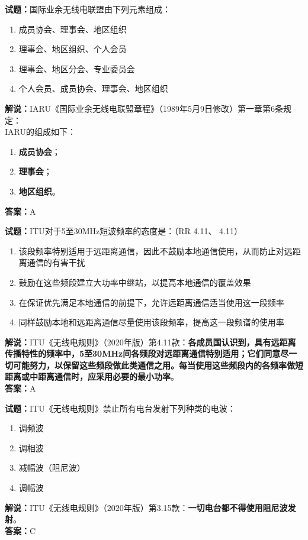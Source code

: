 \documentclass{ctexbook}
\begin{document}
\bigskip

\noindent\textbf{试题：}国际业余无线电联盟由下列元素组成：
\begin{enumerate}[leftmargin=3em]
  \item 成员协会、理事会、地区组织
  \item 理事会、地区组织、个人会员
  \item 理事会、地区分会、专业委员会
  \item 个人会员、成员协会、理事会、地区组织
\end{enumerate}
\noindent\textbf{解说：}IARU《国际业余无线电联盟章程》（1989年5月9日修改）第一章第6条规定：\\
IARU的组成如下：
\begin{enumerate}[leftmargin=3em, label=\alph*)]
  \item \textbf{成员协会}；
  \item \textbf{理事会}；
  \item \textbf{地区组织}。
\end{enumerate}
\noindent\textbf{答案：}A

\bigskip

\noindent\textbf{试题：}ITU对于5至30\unit{\MHz}短波频率的态度是：（RR 4.11、 4.11）
\begin{enumerate}[leftmargin=3em]
  \item 该段频率特别适用于远距离通信，因此不鼓励本地通信使用，从而防止对远距离通信的有害干扰
  \item 鼓励在这些频段建立大功率中继站，以提高本地通信的覆盖效果
  \item 在保证优先满足本地通信的前提下，允许远距离通信适当使用这一段频率
  \item 同样鼓励本地和远距离通信尽量使用该段频率，提高这一段频谱的使用率
\end{enumerate}
\noindent\textbf{解说：}ITU《无线电规则》（2020年版）第4.11款：\textbf{各成员国认识到，具有远距离传播特性的频率中，5至30\unit{\MHz}间各频段对远距离通信特别适用；它们同意尽一切可能努力，以保留这些频段做此类通信之用。每当使用这些频段内的各频率做短距离或中距离通信时，应采用必要的最小功率}。\\\noindent\textbf{答案：}A

\bigskip

\noindent\textbf{试题：}ITU《无线电规则》禁止所有电台发射下列种类的电波：
\begin{enumerate}[leftmargin=3em]
  \item 调频波
  \item 调相波
  \item 减幅波（阻尼波）
  \item 调幅波
\end{enumerate}
\noindent\textbf{解说：}ITU《无线电规则》（2020年版）第3.15款：\textbf{一切电台都不得使用阻尼波发射}。\\\noindent\textbf{答案：}C
\end{document}
